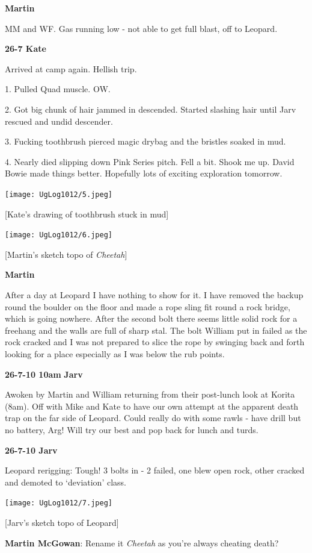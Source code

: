 \textbf{Martin}

MM and WF. Gas running low - not able to get full blast, off to Leopard.

\textbf{26-7 Kate}

Arrived at camp again. Hellish trip.

1. Pulled Quad muscle. OW.

2. Got big chunk of hair jammed in descended. Started slashing hair
until Jarv rescued and undid descender.

3. Fucking toothbrush pierced magic drybag and the bristles soaked in
mud.

4. Nearly died slipping down Pink Series pitch. Fell a bit. Shook me up.
David Bowie made things better. Hopefully lots of exciting exploration
tomorrow.

\texttt{[image: UgLog1012/5.jpeg]}

{[}Kate's drawing of toothbrush stuck in mud{]}

\texttt{[image: UgLog1012/6.jpeg]}

{[}Martin's sketch topo of \emph{Cheetah}{]}

\textbf{Martin}

After a day at Leopard I have nothing to show for it. I have removed the
backup round the boulder on the floor and made a rope sling fit round a
rock bridge, which is going nowhere. After the second bolt there seems
little solid rock for a freehang and the walls are full of sharp stal.
The bolt William put in failed as the rock cracked and I was not
prepared to slice the rope by swinging back and forth looking for a
place especially as I was below the rub points.

\textbf{26-7-10 10am} \textbf{Jarv}

Awoken by Martin and William returning from their post-lunch look at
Korita (8am). Off with Mike and Kate to have our own attempt at the
apparent death trap on the far side of Leopard. Could really do with
some rawls - have drill but no battery, Arg! Will try our best and pop
back for lunch and turds.

\textbf{26-7-10 Jarv}

Leopard rerigging: Tough! 3 bolts in - 2 failed, one blew open rock,
other cracked and demoted to `deviation' class.

\texttt{[image: UgLog1012/7.jpeg]}

{[}Jarv's sketch topo of Leopard{]}

\textbf{Martin McGowan}: Rename it \emph{Cheetah} as you're always
cheating death?

